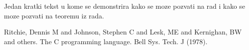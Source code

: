 \documentclass[11pt]{article}
\begin{document}
	Jedan kratki tekst u kome se demonstrira kako se moze pozvati \cite{ritchie1978c} na rad i kako se moze pozvati na teoremu\cite[p. 10-11]{ritchie1978c} iz rada.

	\begin{thebibliography}{9}
		 Ritchie, Dennis M and Johnson, Stephen C and Lesk, ME and Kernighan, BW and others. The C programming language. Bell Sys. Tech. J (1978).
	\end{thebibliography}
\end{document}

